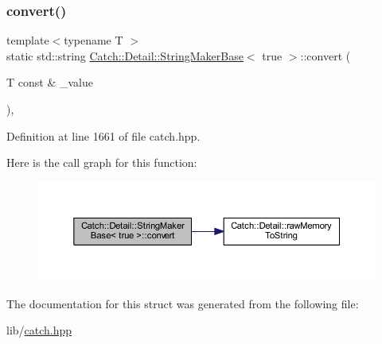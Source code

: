 \subsubsection{\texorpdfstring{convert()}{convert()}}
{\footnotesize\ttfamily template$<$typename T $>$ \\
static std\+::string \hyperlink{struct_catch_1_1_detail_1_1_string_maker_base}{Catch\+::\+Detail\+::\+String\+Maker\+Base}$<$ true $>$\+::convert (\begin{DoxyParamCaption}\item[{T const \&}]{\+\_\+value }\end{DoxyParamCaption})\hspace{0.3cm}{\ttfamily [inline]}, {\ttfamily [static]}}



Definition at line 1661 of file catch.\+hpp.

Here is the call graph for this function\+:\nopagebreak
\begin{figure}[H]
\begin{center}
\leavevmode
\includegraphics[width=350pt]{struct_catch_1_1_detail_1_1_string_maker_base_3_01true_01_4_af9b5fdf7fddd8c5c873caa819e5f00f6_cgraph}
\end{center}
\end{figure}


The documentation for this struct was generated from the following file\+:\begin{DoxyCompactItemize}
\item 
lib/\hyperlink{catch_8hpp}{catch.\+hpp}\end{DoxyCompactItemize}
